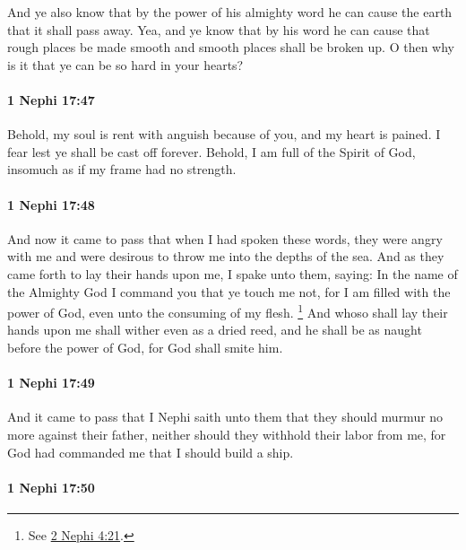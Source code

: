 			And ye also know that by the power of his almighty word
			he can cause the earth that it shall pass away.
			Yea, and ye know that by his word he can cause
			that rough places be made smooth and smooth places shall be broken up.
			O then why is it that ye can be so hard in your hearts?

		\paragraph{1 Nephi 17:47} %
			\label{1NEPHI-17-47}

			Behold, my soul is rent with anguish because of you,
			and my heart is pained.
			I fear lest ye shall be cast off forever.
			Behold, I am full of the Spirit of God,
			insomuch as if my frame had no strength.

		\paragraph{1 Nephi 17:48} %
			\label{1NEPHI-17-48}

			And now it came to pass that when I had spoken these words,
			they were angry with me and were desirous
			to throw me into the depths of the sea.
			And as they came forth to lay their hands upon me,
			I spake unto them, saying:
			In the name of the Almighty God I command you that ye touch me not,
			for I am filled with the power of God,
			even unto the consuming of my flesh.%
				\footnote{%
					See \hyperref[2NEPHI-4-21]{2 Nephi 4:21}.
					}
			And whoso shall lay their hands upon me
			shall wither even as a dried reed,
			and he shall be as naught before the power of God,
			for God shall smite him.

		\paragraph{1 Nephi 17:49} %
			\label{1NEPHI-17-49}

			And it came to pass that I Nephi saith unto them
			that they should murmur no more against their father,
			neither should they withhold their labor from me,
			for God had commanded me that I should build a ship.

		\paragraph{1 Nephi 17:50} %
			\label{1NEPHI-17-50}

